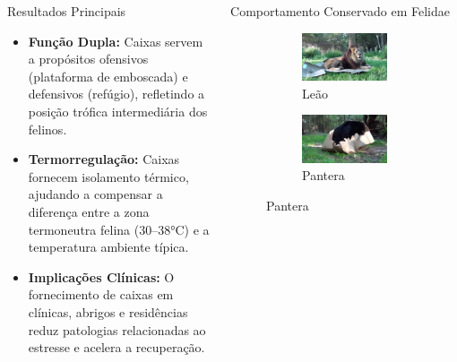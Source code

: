 \documentclass[final]{beamer}
\begin{document}
\begin{frame}[t]
\begin{columns}[T]
\begin{column}{.32\linewidth}
\begin{block}{Resultados Principais}
\begin{itemize}
            \item \textbf{Função Dupla:} Caixas servem a propósitos ofensivos (plataforma de emboscada) e defensivos (refúgio), refletindo a posição trófica intermediária dos felinos.
            \item \textbf{Termorregulação:} Caixas fornecem isolamento térmico, ajudando a compensar a diferença entre a zona termoneutra felina (30–38°C) e a temperatura ambiente típica.
            \item \textbf{Implicações Clínicas:} O fornecimento de caixas em clínicas, abrigos e residências reduz patologias relacionadas ao estresse e acelera a recuperação.
        \end{itemize}
      \end{block}
    \end{column}

    \begin{column}{.32\linewidth}
      \begin{block}{Comportamento Conservado em Felidae}
        \begin{figure}
            \centering
            \begin{subfigure}[b]{0.49\textwidth}
                \includegraphics[width=\textwidth]{01_joseph_lion.jpg}
                \caption{Leão}
            \end{subfigure}
            \hfill
            \begin{subfigure}[b]{0.49\textwidth}
                \includegraphics[width=\textwidth]{02_jumanji_panther.jpg}
                \caption{Pantera}
            \end{subfigure}
            

\end{figure}
\end{block}
\end{column}
\end{columns}
\end{frame}
\end{document}
